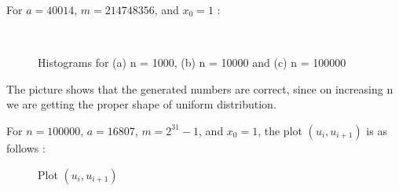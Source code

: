 \documentclass[11pt]{article}
\begin{document}
For $a = 40014$, $m = 214748356$, and $x_{0} = 1$ :
\begin{figure}[H]
  \centering
  \hspace{10mm}
  \\
    \caption{Histograms for (a) n = 1000, (b) n = 10000 and (c) n = 100000}
\end{figure}

The picture shows that the generated numbers are correct, since on increasing n we are getting the proper shape of uniform distribution.


For $n = 100000$, $a = 16807$, $m = 2^{31} - 1$, and $x_{0} = 1$, the plot $(u_i, u_{i+1})$ is as follows :

\begin{figure}[H]
  \centering
      \caption{Plot $(u_i, u_{i+1})$}
\end{figure}
\end{document}
